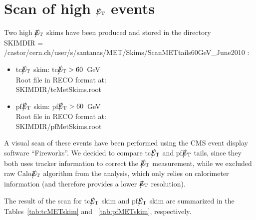 \section{Scan of high $\big\slash\hspace{-1.6ex}{E_\text{T}}$ events}

Two high $\big\slash\hspace{-1.6ex}{E_\text{T}}$ skims have been produced and stored in the directory \\ 
SKIMDIR = /castor/cern.ch/user/s/santanas/MET/Skims/ScanMETtails60GeV\_June2010 :
\begin{itemize}
\item tc$\big\slash\hspace{-1.6ex}{E_\text{T}}$ skim: tc$\big\slash\hspace{-1.6ex}{E_\text{T}}>60$~GeV \\ 
Root file in RECO format at: \\ SKIMDIR/tcMetSkims.root
\item pf$\big\slash\hspace{-1.6ex}{E_\text{T}}$ skim: pf$\big\slash\hspace{-1.6ex}{E_\text{T}}>60$~GeV \\
Root file in RECO format at: \\ SKIMDIR/pfMetSkims.root
\end{itemize}

A visual scan of these events have been performed using the CMS event display
software ``Fireworks''. We decided to compare tc$\big\slash\hspace{-1.6ex}{E_\text{T}}$ and pf$\big\slash\hspace{-1.6ex}{E_\text{T}}$ 
tails, since they both uses tracker information to correct the $\big\slash\hspace{-1.6ex}{E_\text{T}}$ 
measurement, while we excluded raw Calo$\big\slash\hspace{-1.6ex}{E_\text{T}}$ algorithm from the analysis, which only relies 
on calorimeter information (and therefore provides a lower $\big\slash\hspace{-1.6ex}{E_\text{T}}$ resolution).

The result of the scan for tc$\big\slash\hspace{-1.6ex}{E_\text{T}}$ skim and pf$\big\slash\hspace{-1.6ex}{E_\text{T}}$ skim are summarized 
in the Tables~\ref{tab:tcMETskim} and ~\ref{tab:pfMETskim}, respectively.


